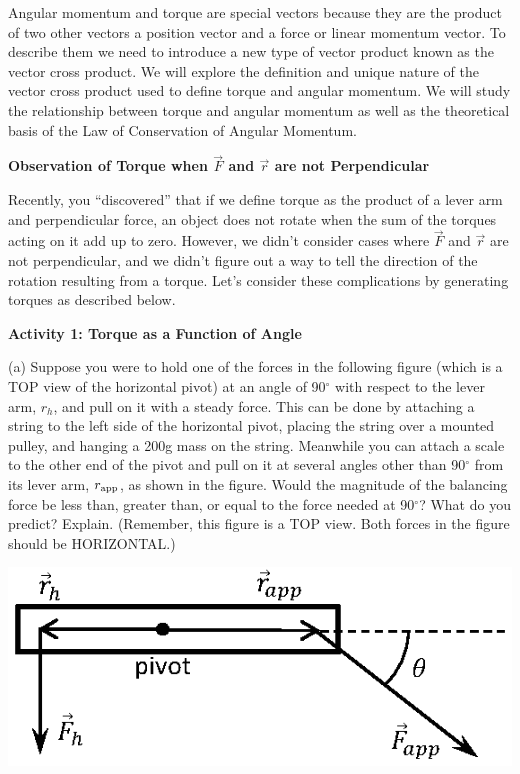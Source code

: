 Angular momentum and torque are special vectors because they are the product
of two other vectors a position vector and a force or linear momentum vector.
To describe them we need to introduce a new type of vector product known as
the vector cross product. We will explore the definition and unique nature of
the vector cross product used to define torque and angular momentum. We will
study the relationship between torque and angular momentum as well as the theoretical
basis of the Law of Conservation of Angular Momentum.

\textbf{Observation of Torque when \( {\vec  F} \) and \( {\vec  r} \)
are not Perpendicular} 

Recently, you ``discovered'' that if we define torque as the
product of a lever arm and perpendicular force, an object does not rotate when
the sum of the torques acting on it add up to zero. However, we didn't consider
cases where \textbf{\( {\vec  F} \)} and \textbf{\( {\vec  r} \)}
are not perpendicular, and we didn't figure out a way to tell the direction
of the rotation resulting from a torque. Let's consider these complications
by generating torques as described below.

\textbf{Activity 1: Torque as a Function of Angle} 

(a) Suppose you were to hold one of the forces in the following figure (which is a TOP view of the horizontal pivot) at an angle of 90\( ^{\circ } \)
with respect to the lever arm, \( r_{h} \), and pull on it with a steady force.
This can be done by attaching a string to the left side of the horizontal pivot, placing the string over a mounted pulley, and hanging a 200g mass on the string. Meanwhile you can attach a scale to the other end of the pivot and pull on it at several angles other than 90\( ^{\circ } \)
from its lever arm, \( r_{\rm app} \), as shown in the figure. Would the magnitude of the balancing force be less than, greater than, or equal to the force needed at 90\( ^{\circ } \)? What do you predict? Explain. (Remember, this figure is a TOP view. Both forces in the figure should be HORIZONTAL.)
{\par\raggedright \includegraphics{ang_mom/ang_mom_fig1_new.eps} \par}


